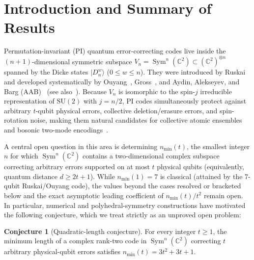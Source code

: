 \documentclass[11pt,letterpaper]{article}
\theoremstyle{definition}
\newtheorem{conjecture}[theorem]{Conjecture}
\theoremstyle{remark}
\newcommand{\Sym}{\operatorname{Sym}}
\newcommand{\SU}{\mathrm{SU}}
\newcommand{\C}{\mathbb{C}}
\newcommand{\ket}[1]{|#1\rangle}
\begin{document}
\section{Introduction and Summary of Results}
Permutation-invariant (PI) quantum error-correcting codes live inside the $(n+1)$-dimensional symmetric subspace $V_n = \Sym^n(\C^2) \subset (\C^2)^{\otimes n}$ spanned by the Dicke states $\ket{D_n^w}$ ($0 \le w \le n$). They were introduced by Ruskai~\cite{Ruskai2000} and developed systematically by Ouyang~\cite{Ouyang2014}, Gross~\cite{Gross2021}, and Aydin, Alekseyev, and Barg (AAB)~\cite{AAB2024} (see also~\cite{Ouyang2024,SpinBosonicPI2026}). Because $V_n$ is isomorphic to the spin-$j$ irreducible representation of $\SU(2)$ with $j=n/2$, PI codes simultaneously protect against arbitrary $t$-qubit physical errors, collective deletion/erasure errors, and spin-rotation noise, making them natural candidates for collective atomic ensembles and bosonic two-mode encodings~\cite{TwoModeLoss2026}.

A central open question in this area is determining $n_{\min}(t)$, the smallest integer $n$ for which $\Sym^n(\C^2)$ contains a two-dimensional complex subspace correcting arbitrary errors supported on at most $t$ physical qubits (equivalently, quantum distance $d \ge 2t+1$). While $n_{\min}(1)=7$ is classical (attained by the 7-qubit Ruskai/Ouyang code), the values beyond the cases resolved or bracketed below and the exact asymptotic leading coefficient of $n_{\min}(t)/t^2$ remain open. In particular, numerical and polyhedral-symmetry constructions have motivated the following conjecture, which we treat strictly as an unproved open problem:

\begin{conjecture}[Quadratic-length conjecture]\label{conj:3t2}
For every integer $t \ge 1$, the minimum length of a complex rank-two code in $\Sym^n(\C^2)$ correcting $t$ arbitrary physical-qubit errors satisfies $n_{\min}(t) = 3t^2 + 3t + 1$.
\end{conjecture}
\end{document}
